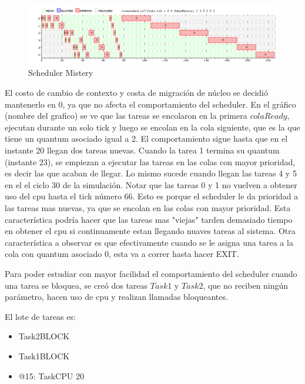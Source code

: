 \begin{itemize}
\begin{itemize}
\end{itemize}

\begin{figure}[H]
  \centering
    \includegraphics[width=1\textwidth]{../ej7/taskCpuMistery.png}
    \caption{Scheduler Mistery}
\end{figure}


El costo de cambio de contexto y costa de migración de núcleo se decidió mantenerlo en 0, ya que no afecta el comportamiento del scheduler.
En el gráfico (nombre del grafico) se ve que las tareas se encolaron en la primera $colaReady$, ejecutan durante un solo tick y luego se encolan en 
la cola siguiente, que es la que tiene un quantum asociado igual a 2. El comportamiento sigue hasta que en el instante 20 llegan dos tareas nuevas.
Cuando la tarea 1 termina su quantum (instante 23), se empiezan a ejecutar las tareas en las colas con mayor prioridad, es decir 
las que acaban de llegar. Lo mismo sucede cuando llegan las tareas 4 y 5 en el el ciclo 30 de la simulación. Notar que las tareas 0 y 1 no vuelven
a obtener uso del cpu hasta el tick número 66. Esto es porque el scheduler le da prioridad a las tareas mas nuevas, ya que se encolan en las colas con
mayor prioridad. Esta característica podría hacer que las tareas mas "viejas" tarden demasiado tiempo en obtener el cpu si continuamente estan llegando 
nuaves tareas al sistema. 
Otra característica a observar es que efectivamente cuando se le asigna una tarea a la cola con quantum asociado 0, esta va a correr hasta hacer EXIT.

Para poder estudiar con mayor facilidad el comportamiento del scheduler cuando una tarea se bloquea, se creó dos tareas $Task1$ y $Task2$, que no reciben ningún
parámetro, hacen uso de cpu y realizan llamadas bloqueantes. 

El lote de tareas es:

\begin{itemize}

\item Task2BLOCK
\item Task1BLOCK
\item @15:
	TaskCPU 20


\end{itemize}
\end{itemize}
